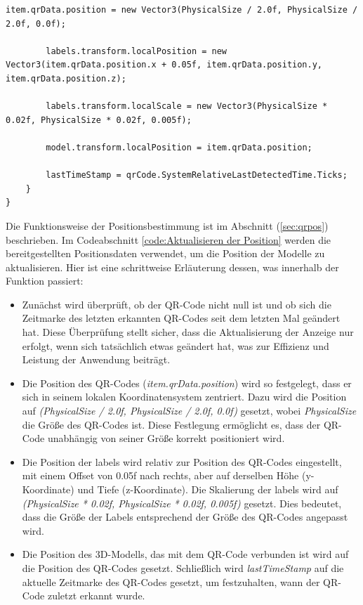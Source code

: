 \begin{itemize}
\begin{lstlisting}[style=csharp, caption={Aktualisieren der Position}, label=code:Aktualisieren der Position]
        item.qrData.position = new Vector3(PhysicalSize / 2.0f, PhysicalSize / 2.0f, 0.0f);

        labels.transform.localPosition = new Vector3(item.qrData.position.x + 0.05f, item.qrData.position.y, item.qrData.position.z);

        labels.transform.localScale = new Vector3(PhysicalSize * 0.02f, PhysicalSize * 0.02f, 0.005f);

        model.transform.localPosition = item.qrData.position;

        lastTimeStamp = qrCode.SystemRelativeLastDetectedTime.Ticks;
    }
}
\end{lstlisting}
Die Funktionsweise der Positionsbestimmung ist im Abschnitt (\ref{sec:qrpos}) beschrieben. Im Codeabschnitt \ref{code:Aktualisieren der Position} werden die bereitgestellten Positionsdaten verwendet, um die Position der Modelle zu aktualisieren. Hier ist eine schrittweise Erläuterung dessen, was innerhalb der Funktion passiert:
\begin{itemize}
    \item Zunächst wird überprüft, ob der QR-Code nicht null ist und ob sich die Zeitmarke des letzten erkannten QR-Codes seit dem letzten Mal geändert hat. Diese Überprüfung stellt sicher, dass die Aktualisierung der Anzeige nur erfolgt, wenn sich tatsächlich etwas geändert hat, was zur Effizienz und Leistung der Anwendung beiträgt.
    \item Die Position des QR-Codes (\textit{item.qrData.position}) wird so festgelegt, dass er sich in seinem lokalen Koordinatensystem zentriert. Dazu wird die Position auf \textit{(PhysicalSize / 2.0f, PhysicalSize / 2.0f, 0.0f)} gesetzt, wobei \textit{PhysicalSize} die Größe des QR-Codes ist. Diese Festlegung ermöglicht es, dass der QR-Code unabhängig von seiner Größe korrekt positioniert wird.
    \item Die Position der labels wird relativ zur Position des QR-Codes eingestellt, mit einem Offset von 0.05f nach rechts, aber auf derselben Höhe (y-Koordinate) und Tiefe (z-Koordinate). Die Skalierung der labels wird auf \textit{(PhysicalSize * 0.02f, PhysicalSize * 0.02f, 0.005f)} gesetzt. Dies bedeutet, dass die Größe der Labels entsprechend der Größe des QR-Codes angepasst wird.
    \item Die Position des 3D-Modells, das mit dem QR-Code verbunden ist wird auf die Position des QR-Codes gesetzt. Schließlich wird \textit{lastTimeStamp} auf die aktuelle Zeitmarke des QR-Codes gesetzt, um festzuhalten, wann der QR-Code zuletzt erkannt wurde.
\end{itemize}


\end{itemize}

